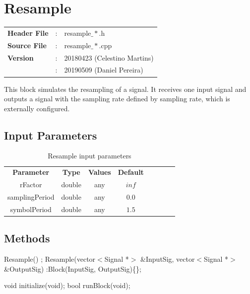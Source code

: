 \clearpage

\section{Resample}

\begin{tcolorbox}	
	\begin{tabular}{p{2.75cm} p{0.2cm} p{10.5cm}} 	
		\textbf{Header File}   &:& resample$\_*$.h \\
		\textbf{Source File}   &:& resample$\_*$.cpp \\
        \textbf{Version}       &:& 20180423 (Celestino Martins) \\
        					   &:& 20190509 (Daniel Pereira)
	\end{tabular}
\end{tcolorbox}

This block simulates the resampling of a signal. It receives one input signal and outputs a signal with the sampling rate defined by sampling rate, which is externally configured.

\subsection*{Input Parameters}

\begin{table}[h]
	\centering
	\begin{tabular}{|c|c|c|c|cccc}
		\cline{1-4}
		\textbf{Parameter} & \textbf{Type} & \textbf{Values} &   \textbf{Default}& \\ \cline{1-4}
		rFactor           & double & any & $inf$ \\ \cline{1-4}
		samplingPeriod    & double & any & $0.0$ \\ \cline{1-4}	
        symbolPeriod      & double & any & $1.5$ \\ \cline{1-4}	
	\end{tabular}
	\caption{Resample input parameters}
	\label{table:resample_in_par}
\end{table}


\subsection*{Methods}

Resample() {};
Resample(vector$<$Signal *$>$ \&InputSig, vector$<$Signal *$>$ \&OutputSig) :Block(InputSig, OutputSig)\{\};

void initialize(void);
bool runBlock(void);

